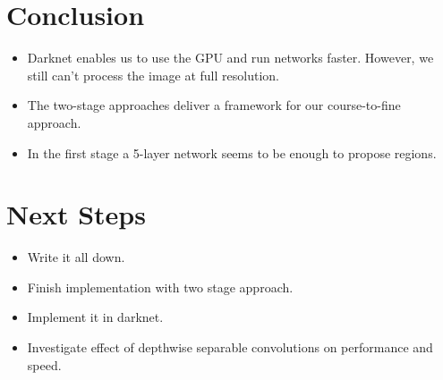 \documentclass{article}
\begin{document}
\newpage


\section{Conclusion}
\begin{itemize}
	\item Darknet enables us to use the GPU and run networks faster. However, we still can't process the image at full resolution.
	\item The two-stage approaches deliver a framework for our course-to-fine approach.
	\item In the first stage a 5-layer network seems to be enough to propose regions.
\end{itemize}

\section{Next Steps}
\begin{itemize}
	\item Write it all down.
	\item Finish implementation with two stage approach.
	\item Implement it in darknet.
	\item Investigate effect of depthwise separable convolutions on performance and speed.
	
\end{itemize}
\end{document}
